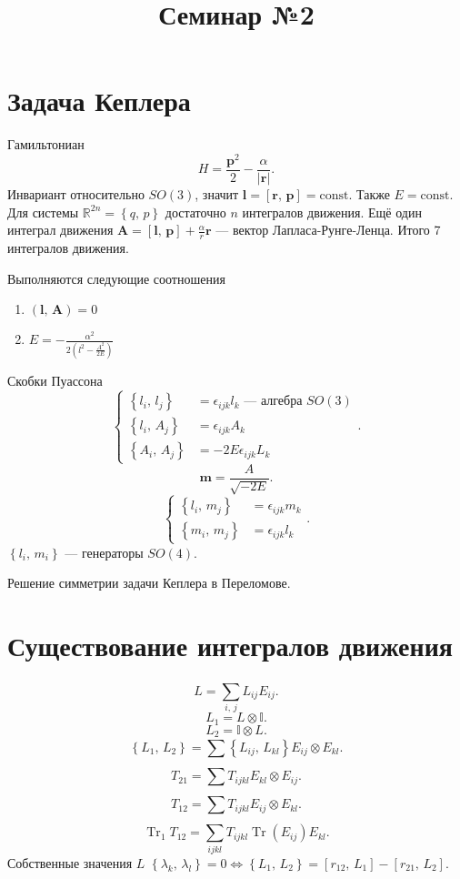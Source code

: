 \documentclass[a4paper]{article}
\title{Семинар №2}
\begin{document}
	\maketitle
\section*{Задача Кеплера}
Гамильтониан
\[
	H= \frac{\mathbf{p}^2}{2}-\frac{\alpha}{|\mathbf{r}|}
.\] 
Инвариант относительно $SO(3)$, значит  $\mathbf{l}=\left[ \mathbf{r},\,\mathbf{p} \right]=\text{const} $. Также $E= \text{const}$.
Для системы $\mathbb{R}^{2n}=\left\{ q,\,p \right\} $ достаточно $n$ интегралов движения.
Ещё один интеграл движения $\mathbf{A}=\left[ \mathbf{l},\,\mathbf{p} \right] +\frac{\alpha}{r}\mathbf{r}$ --- вектор Лапласа-Рунге-Ленца.
Итого 7 интегралов движения.

Выполняются следующие соотношения
\begin{enumerate}
	\item $\left( \mathbf{l},\,\mathbf{A} \right)=0 $
	\item $\displaystyle E=-\frac{\alpha^2}{2\left(l^2-\frac{A^2}{2E}\right)}$
\end{enumerate}
Скобки Пуассона
\[
\left\{
\begin{aligned}
	\left\{ l_i,\,l_j \right\} &=\epsilon_{ijk}l_k \text{ --- алгебра }SO(3)\\
	\left\{ l_i,\,A_j \right\} &= \epsilon_{ijk} A_k\\
	\left\{ A_i,\,A_j \right\} &=-2E \epsilon_{ijk}L_k
\end{aligned}
\right.
.\] 
\[
	\mathbf{m}= \frac{A}{\sqrt{-2E} }
.\] 
\[
\left\{
\begin{aligned}
	\left\{ l_i,\,m_j \right\} &= \epsilon_{ijk} m_k \\
	\left\{ m_i,\,m_j \right\} &=\epsilon_{ijk}l_k
\end{aligned}
\right.
.\] 
$\left\{ l_i,\,m_i \right\} $ --- генераторы $SO(4)$.

Решение симметрии задачи Кеплера в Переломове.
\section*{Существование интегралов движения}
\[
L= \sum_{i,\,j}^{} L_{ij} E_{ij}
.\] 
\[
	L_1=L\otimes \mathbb{I}
.\] 
\[
	L_2=\mathbb{I}\otimes L
.\] 
\[
\left\{ L_1,\,L_2 \right\} =\sum_{}^{} \left\{ L_{ij},\,
L_{kl}\right\} E_{ij}\otimes E_{kl}
.\] 
\[
T_{21}=\sum_{}^{} T_{ijkl}E_{kl}\otimes E_{ij}
.\] 
\[
T_{12}=\sum_{}^{} T_{ijkl}E_{ij}\otimes E_{kl}
.\] 
\[
	\operatorname{Tr}_1T_{12}= \sum_{ijkl}^{} T_{ijkl}\operatorname{Tr}(E_{ij})E_{kl}
.\] 
Собственные значения $L$ $\left\{ \lambda_k,\,\lambda_l \right\} =0
 \Leftrightarrow \left\{ L_1,\,L_2 \right\} =\left[ r_{12},\,L_1 \right] -\left[ r_{21},\,L_2 \right] $.
\end{document}
